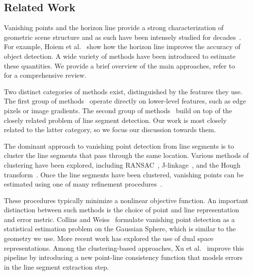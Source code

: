 \subsection{Related Work}
\label{sec:relatedwork}

Vanishing points and the horizon line provide a strong
characterization of geometric scene structure and as such have been
intensely studied for
decades~\cite{barnard1983interpreting,magee1984determining}.  For
example, Hoiem et al.~\cite{hoiem2008putting} show how the horizon
line improves the accuracy of object detection.  A wide variety of
methods have been introduced to estimate these quantities.  We provide
a brief overview of the main approaches, refer
to~\cite{szeliski2010computer} for a comprehensive review. 

Two distinct categories of methods exist, distinguished by the
features they use. The first group of methods~\cite{geoparser2010,
manhattanbayesian1999, edgebased2008,atlanta2004} operate directly
on lower-level features, such as edge pixels or image gradients.  The
second group of methods~\cite{nopriori2003, edgebased2008,
alignment2014, houghvp1994, selfsketch2012, wildenauer2012,
kitware2013} build on top of the closely related problem of line
segment detection.  Our work is most closely related to the latter
category, so we focus our discussion towards them.

The dominant approach to vanishing point detection from line segments
is to cluster the line segments that pass through the same location.
Various methods of clustering have been explored, including
RANSAC~\cite{ransac1981}, J-linkage~\cite{tardif2009}, and the Hough
transform~\cite{hough1959}. Once the line segments have been
clustered, vanishing points can be estimated using one of many
refinement procedures~\cite{alignment2014,atlanta2004,tardif2009,
wildenauer2012,kitware2013}. 

These procedures typically minimize a
nonlinear objective function. An important distinction between such
methods is the choice of point and line representation and error
metric. Collins and Weiss~\cite{unitsphere1990} formulate vanishing
point detection as a statistical estimation problem on the Gaussian
Sphere, which is similar to the geometry we use.  More recent work
has explored the use of dual space~\cite{alignment2014,dualspace2013}
representations. Among the clustering-based approaches, Xu et
al.~\cite{kitware2013} improve this pipeline by introducing a new
point-line consistency function that models errors in the line segment
extraction step.

